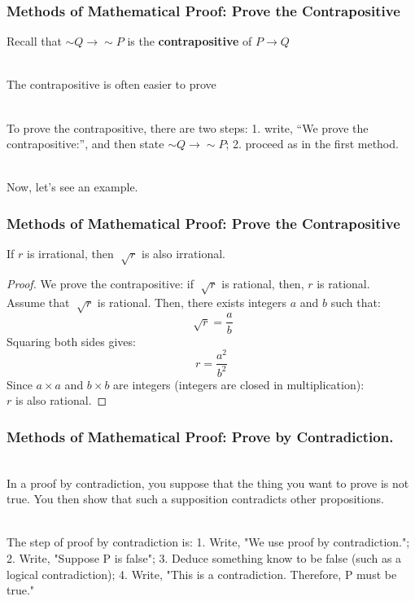 \documentclass[aspectratio=169]{beamer}
\numberwithin{equation}{section}
\begin{document}
\begin{frame}
\frametitle{Methods of Mathematical Proof: Prove the Contrapositive}

Recall that  $\sim Q \rightarrow \sim P$ is the \textbf{contrapositive} of $P\rightarrow Q$\pause

\ \\The contrapositive is often easier to prove \pause

\ \\To prove the contrapositive, there are two steps: 1. write, ``We prove the contrapositive:'', and then state $\sim Q \rightarrow \sim P$; 2. proceed as in the first method. \pause

\ \\Now, let's see an example.

\end{frame}



\begin{frame}
\frametitle{Methods of Mathematical Proof: Prove the Contrapositive}

\begin{theorem}
If $r$ is irrational, then $\sqrt[]{r}$ is also irrational.
\end{theorem}
\pause
\begin{proof}
We prove the contrapositive: if $\sqrt[]{r}$ is rational, then, $r$ is rational. \pause \\ Assume that $\sqrt[]{r}$ is rational. Then, there exists integers $a$ and $b$ such that:
$$\sqrt[]{r} = \frac{a}{b}$$ \pause
Squaring both sides gives:
$$r = \frac{a^{2}}{b^{2}}$$ \pause
Since $a\times a $ and $b\times b$ are integers (integers are closed in multiplication):\\ $r$ is also rational.
\end{proof}

\end{frame}



\begin{frame}
\frametitle{Methods of Mathematical Proof: Prove by Contradiction.}

\ \\In a proof by contradiction, you suppose that the thing you want to prove is not true.  You then show that such a supposition contradicts other propositions. \pause

\ \\The step of proof by contradiction is: 1. Write, "We use proof by contradiction."; 2. Write, "Suppose P is false"; 3. Deduce something know to be false (such as a logical contradiction); 4. Write, "This is a contradiction. Therefore, P must be true."

\end{frame}
\end{document}
